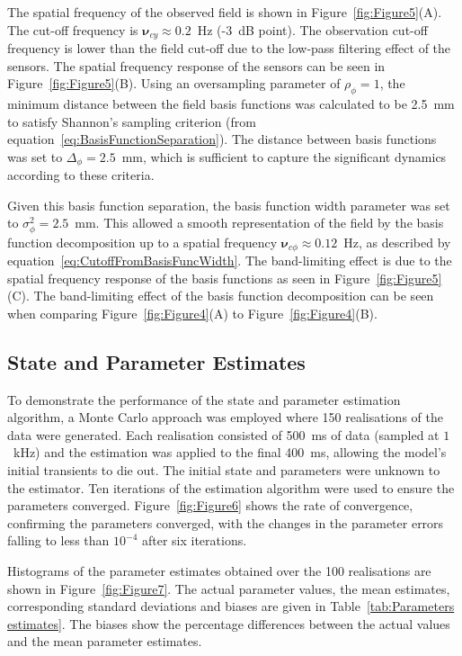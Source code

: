 \documentclass[12pt]{iopart}
\begin{document}
The spatial frequency of the observed field is shown in Figure~\ref{fig:Figure5}(A). The cut-off frequency is $\boldsymbol{\nu}_{cy} \approx 0.2$~Hz (-3~dB point). The observation cut-off frequency is lower than the field cut-off due to the low-pass filtering effect of the sensors. The spatial frequency response of the sensors can be seen in Figure~\ref{fig:Figure5}(B). Using an oversampling parameter of $\rho_{\phi}=1$, the minimum distance between the field basis functions was calculated to be 2.5~mm to satisfy Shannon's sampling criterion (from equation~\ref{eq:BasisFunctionSeparation}). The distance between basis functions was set to $\Delta_{\phi}=2.5$~mm, which is sufficient to capture the significant dynamics according to these criteria.

Given this basis function separation, the basis function width parameter was set to $\sigma_{\phi}^2=2.5$~mm. This allowed a smooth representation of the field by the basis function decomposition up to a spatial frequency $\boldsymbol{\nu}_{c\phi} \approx 0.12$~Hz, as described by equation~\ref{eq:CutoffFromBasisFuncWidth}. The band-limiting effect is due to the spatial frequency response of the basis functions as seen in Figure~\ref{fig:Figure5}(C). The band-limiting effect of the basis function decomposition can be seen when comparing Figure~\ref{fig:Figure4}(A) to Figure~\ref{fig:Figure4}(B).

\subsection{State and Parameter Estimates} 
\label{sec:state_and_param_results}
To demonstrate the performance of the state and parameter estimation algorithm, a Monte Carlo approach was employed where 150 realisations of the data were generated. Each realisation consisted of 500~ms of data (sampled at $1$~kHz) and the estimation was applied to the final 400~ms, allowing the model's initial transients to die out. The initial state and parameters were unknown to the estimator. Ten iterations of the estimation algorithm were used to ensure the parameters  converged. Figure~\ref{fig:Figure6} shows the rate of convergence, confirming the parameters converged, with the changes in the parameter errors falling to less than $10^{-4}$ after six iterations.

Histograms of the parameter estimates obtained over the 100 realisations are shown in Figure~\ref{fig:Figure7}. The actual parameter values, the mean estimates, corresponding standard deviations and biases are given in Table~\ref{tab:Parameters estimates}. The biases show the percentage differences between the actual values and the mean parameter estimates. 
\end{document}
